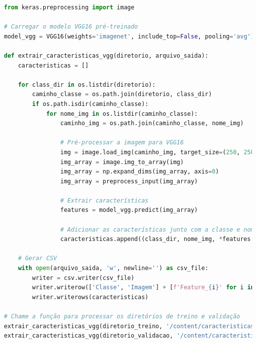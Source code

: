 
\begin{lstlisting}[language=Python, style=input]
from keras.preprocessing import image

# Carregar o modelo VGG16 pré-treinado
model_vgg = VGG16(weights='imagenet', include_top=False, pooling='avg')

def extrair_caracteristicas_vgg(diretorio, arquivo_saida):
    caracteristicas = []

    for class_dir in os.listdir(diretorio):
        caminho_classe = os.path.join(diretorio, class_dir)
        if os.path.isdir(caminho_classe):
            for nome_img in os.listdir(caminho_classe):
                caminho_img = os.path.join(caminho_classe, nome_img)

                # Pré-processar a imagem para VGG16
                img = image.load_img(caminho_img, target_size=(250, 250))  # Mudar para 250x250 se necessário
                img_array = image.img_to_array(img)
                img_array = np.expand_dims(img_array, axis=0)
                img_array = preprocess_input(img_array)

                # Extrair características
                features = model_vgg.predict(img_array)

                # Adicionar as características junto com a classe e nome da imagem
                caracteristicas.append((class_dir, nome_img, *features.flatten()))  # Flatten para um vetor

    # Gerar CSV
    with open(arquivo_saida, 'w', newline='') as csv_file:
        writer = csv.writer(csv_file)
        writer.writerow(['Classe', 'Imagem'] + [f'Feature_{i}' for i in range(features.shape[1])])  # Cabeçalho
        writer.writerows(caracteristicas)

# Chame a função para processar os diretórios de treino e validação
extrair_caracteristicas_vgg(diretorio_treino, '/content/caracteristicas_treino_vgg16.csv')
extrair_caracteristicas_vgg(diretorio_validacao, '/content/caracteristicas_validacao_vgg16.csv')
\end{lstlisting}



